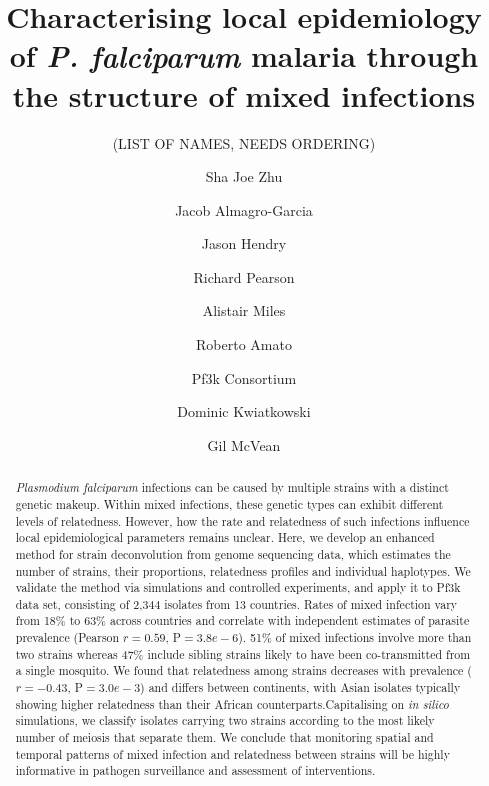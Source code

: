 \documentclass[9pt,lineno]{elife}
\newcounter{todocounter}
\newcommand{\done}[2][]
{\todo[color=green!40, #1]{#2}}
\newcommand{\donenum}[2][]
{\stepcounter{todocounter}\done[#1]{\thetodocounter: #2}}
\begin{document}
\title{Characterising local epidemiology of {\it P. falciparum} malaria through the structure of mixed infections}
\newcommand\shorttitle{Mixed infections in malaria}
\date{}

\author[?]{(LIST OF NAMES, NEEDS ORDERING)}
\author[1]{Sha Joe Zhu}
\author[1,2,3,4]{Jacob Almagro-Garcia}
\author[1]{Jason Hendry}
\author[2,3]{Richard Pearson}
\author[2,3]{Alistair Miles}
\author[2,3]{Roberto Amato}
\author[?]{Pf3k Consortium}
\author[2,3]{Dominic Kwiatkowski}
\author[1,3]{Gil McVean}



\maketitle{}

\begin{abstract}
{\it Plasmodium falciparum} infections can be caused by multiple strains with a distinct genetic makeup. Within mixed infections, these genetic types can exhibit different levels of relatedness. However, how the rate and relatedness of such infections influence local epidemiological parameters remains unclear.  Here, we develop an enhanced method for strain deconvolution from genome sequencing data, which estimates the number of strains, their proportions, relatedness profiles and individual haplotypes.  We validate the method via simulations and controlled experiments, and apply it to Pf3k data set, consisting of 2,344 isolates from 13 countries.  Rates of mixed infection vary from 18\% to 63\% across countries and correlate with independent estimates of parasite prevalence (Pearson $r = 0.59$, P$=3.8e-6$).  51\% of mixed infections involve more than two strains whereas 47\% include sibling strains likely to have been co-transmitted from a single mosquito. We found that relatedness among strains decreases with prevalence ($r = -0.43$, P$=3.0e-3$) and differs between continents, with Asian isolates typically showing higher relatedness than their African counterparts.Capitalising on \textit{in silico} simulations, we classify isolates carrying two strains according to the most likely number of meiosis that separate them. We conclude that monitoring spatial and temporal patterns of mixed infection and relatedness between strains will be highly informative in pathogen surveillance and assessment of interventions.
\end{abstract}
\end{document}
